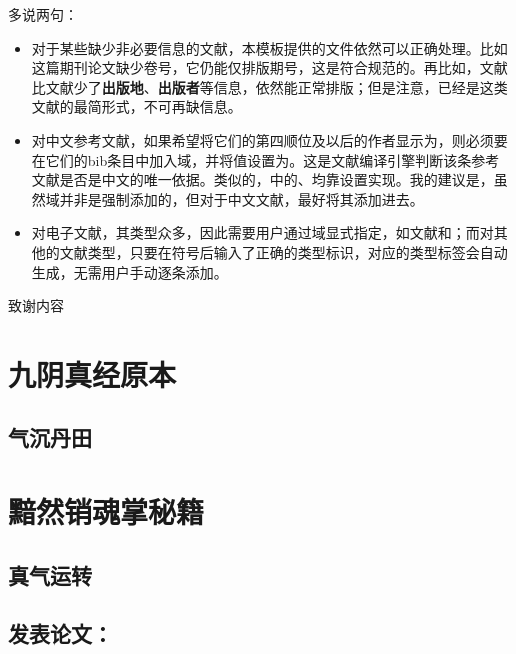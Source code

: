 \documentclass[print, doctor, vlined]{DissertUESTC}
\begin{document}
	多说两句：
	\begin{itemize}
		\item 对于某些缺少非必要信息的文献，本模板提供的文件依然可以正确处理。比如\cite{王晓琰2019关于连续出版会议论文著录格式的探讨}这篇期刊论文缺少卷号，它仍能仅排版期号，这是符合规范的。再比如，文献\cite{电子文献2}比文献\cite{电子文献1}少了\textbf{出版地}、\textbf{出版者}等信息，依然能正常排版；但是注意，\cite{电子文献2}已经是这类文献的最简形式，不可再缺信息。
		
		\item 对中文参考文献，如果希望将它们的第四顺位及以后的作者显示为，则必须要在它们的bib条目中加入域，并将值设置为。这是文献编译引擎判断该条参考文献是否是中文的唯一依据。类似的，\cite{罗杰斯2011}中的、均靠设置实现。我的建议是，虽然域并非是强制添加的，但对于中文文献，最好将其添加进去。
		
		\item 对电子文献，其类型众多，因此需要用户通过域显式指定，如文献\cite{电子文献1}和\cite{电子文献2}；而对其他的文献类型，只要在符号后输入了正确的类型标识，对应的类型标签会自动生成，无需用户手动逐条添加。
	\end{itemize}
	
	
	\acknowledgement
	
	致谢内容
	
	
	
	
	
	\appendix
	
	\chapter{九阴真经原本}
	\section{气沉丹田}
	
	\chapter{黯然销魂掌秘籍}
	\section{真气运转}
	
	\achievement %
	
	\section*{发表论文：}
	
\end{document}
